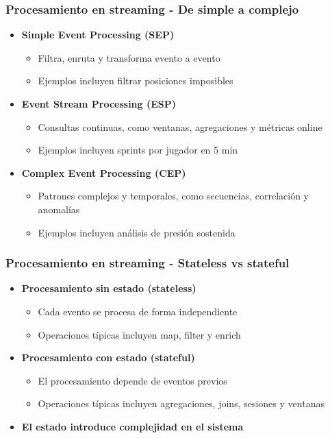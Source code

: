 \documentclass[aspectratio=169]{beamer}
\begin{document}
\begin{frame}
\frametitle{Procesamiento en streaming - De simple a complejo}
\begin{itemize}
  \item \textbf{Simple Event Processing (SEP)}
  \begin{itemize}
    \item Filtra, enruta y transforma evento a evento
    \item Ejemplos incluyen filtrar posiciones imposibles
  \end{itemize}

  \vspace{0.5em}

  \item \textbf{Event Stream Processing (ESP)}
  \begin{itemize}
    \item Consultas continuas, como ventanas, agregaciones y métricas online
    \item Ejemplos incluyen sprints por jugador en 5 min
  \end{itemize}

  \vspace{0.5em}

  \item \textbf{Complex Event Processing (CEP)}
  \begin{itemize}
    \item Patrones complejos y temporales, como secuencias, correlación y anomalías
    \item Ejemplos incluyen análisis de presión sostenida 
  \end{itemize}
\end{itemize}
\end{frame}


\begin{frame}
\frametitle{Procesamiento en streaming - Stateless vs stateful}
\begin{itemize}
  \item \textbf{Procesamiento sin estado (stateless)}
  \begin{itemize}
    \item Cada evento se procesa de forma independiente
    \item Operaciones típicas incluyen map, filter y enrich
  \end{itemize}

  \vspace{1em}

  \item \textbf{Procesamiento con estado (stateful)}
  \begin{itemize}
    \item El procesamiento depende de eventos previos
    \item Operaciones típicas incluyen agregaciones, joins, sesiones y ventanas
  \end{itemize}

  \vspace{1em}

  \item \textbf{El estado introduce complejidad en el sistema}
\end{itemize}
\end{frame}
\end{document}
